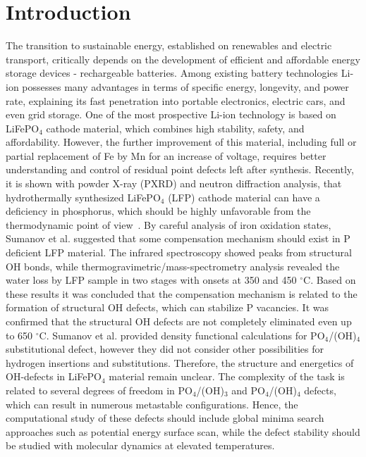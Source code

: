 \chapter*{Introduction}
The transition to sustainable energy, established on renewables and electric transport, critically depends on the development of efficient and affordable energy storage devices - rechargeable batteries. Among existing battery technologies Li-ion possesses many advantages in terms of specific energy, longevity, and power rate, explaining its fast penetration into portable electronics, electric cars, and even grid storage. 
One of the most prospective Li-ion technology is based on LiFePO$_4$ cathode material,  which combines high stability, safety, and affordability. However, the further improvement of this material, including full or partial replacement of Fe by Mn for an increase of voltage, requires better understanding and control of residual point defects left after synthesis.
Recently, it is shown with powder X-ray (PXRD) and neutron diffraction analysis, that hydrothermally synthesized LiFePO$_4$ (LFP) cathode material can have a deficiency in phosphorus, which should be highly unfavorable from the thermodynamic point of view~\cite{sumanov2019hydrotriphylites}. By careful analysis of iron oxidation states, Sumanov et al. suggested that some compensation mechanism should exist in P deficient LFP material. The infrared spectroscopy showed peaks from structural OH bonds, while thermogravimetric/mass-spectrometry analysis revealed the water loss by LFP sample in two stages with onsets at 350 and 450 $^\circ$C. Based on these results it was concluded that the compensation mechanism is related to the formation of structural OH defects, which can stabilize P vacancies. It was confirmed that the structural OH defects are not completely eliminated even up to 650 $^\circ$C. Sumanov et al. provided density functional calculations for PO$_4$/(OH)$_4$ substitutional defect, however they did not consider other possibilities for hydrogen insertions and substitutions. Therefore, the structure and energetics of OH-defects in LiFePO$_4$ material remain unclear. The complexity of the task is related to several degrees of freedom in PO$_4$/(OH)$_3$ and PO$_4$/(OH)$_4$ defects, which can result in numerous metastable configurations. Hence, the computational study of these defects should include global minima search approaches such as potential energy surface scan, while the defect stability should be studied with molecular dynamics at elevated temperatures.

